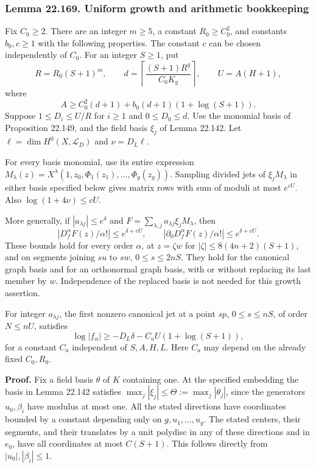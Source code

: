 \documentclass[
  11pt,
  a4paper,
]{article}
\begin{document}
\subsubsection{Lemma 22.169. Uniform growth and arithmetic
bookkeeping}\label{lemma-22.169.-uniform-growth-and-arithmetic-bookkeeping}

Fix \(C_0\ge2\). There are an integer \(m\ge5\), a constant
\(R_0\ge C_0^2\), and constants \(b_0,c\ge1\) with the following
properties. The constant \(c\) can be chosen independently of \(C_0\).
For an integer \(S\ge1\), put \[
 R=R_0(S+1)^m,\qquad
 d=\left\lceil\frac{(S+1)R^g}{C_0K_g}\right\rceil,
 \qquad U=A(H+1),
 \tag{22.471}
\] where \[
 A\ge C_0^2(d+1)+b_0(d+1)(1+\log(S+1)).
 \tag{22.472}
\] Suppose \(1\le D_i\le U/R\) for \(i\ge1\) and \(0\le D_0\le d\). Use
the monomial basis of Proposition 22.149, and the field basis \(\xi_j\)
of Lemma 22.142. Let \(\ell=\dim H^0(X,\mathcal L_D)\) and
\(\nu=D_L\ell\).

For every basis monomial, use its entire expression
\(M_\lambda(z)=X^\lambda(1,z_0,\Phi_1(z_1),\ldots,
\Phi_g(z_g))\). Sampling divided jets of \(\xi_jM_\lambda\) in either
basis specified below gives matrix rows with sum of moduli at most
\(e^{cU}\). Also \(\log(1+4\nu)\le cU\).

More generally, if \(|a_{\lambda j}|\le e^\delta\) and
\(F=\sum_{\lambda,j}a_{\lambda j}\xi_jM_\lambda\), then \[
 \left|D_f^\alpha F(z)/\alpha!\right|
       \le e^{\delta+cU},\qquad
 \left|\partial_0D_f^\alpha F(z)/\alpha!\right|
       \le e^{\delta+cU}.
 \tag{22.473}
\] These bounds hold for every order \(\alpha\), at \(z=\zeta w\) for
\(|\zeta|\le8(4n+2)(S+1)\), and on segments joining \(su\) to \(sw\),
\(0\le s\le2nS\). They hold for the canonical graph basis and for an
orthonormal graph basis, with or without replacing its last member by
\(w\). Independence of the replaced basis is not needed for this growth
assertion.

For integer \(a_{\lambda j}\), the first nonzero canonical jet at a
point \(sp\), \(0\le s\le nS\), of order \(N\le nU\), satisfies \[
 \log|f_\alpha|\ge-D_L\delta-C_aU(1+\log(S+1)),
 \tag{22.474}
\] for a constant \(C_a\) independent of \(S,A,H,L\). Here \(C_a\) may
depend on the already fixed \(C_0,R_0\).

\textbf{Proof.} Fix a field basis \(\theta\) of \(K\) containing one. At
the specified embedding the basis in Lemma 22.142 satisfies
\(\max_j|\xi_j|\le\Theta:=\max_j|\theta_j|\), since the generators
\(u_0,\beta_i\) have modulus at most one. All the stated directions have
coordinates bounded by a constant depending only on
\(g,u_1,\ldots,u_g\). The stated centers, their segments, and their
translates by a unit polydisc in any of these directions and in \(e_0\),
have all coordinates at most \(C(S+1)\). This follows directly from
\(|u_0|,|\beta_i|\le1\).
\end{document}
